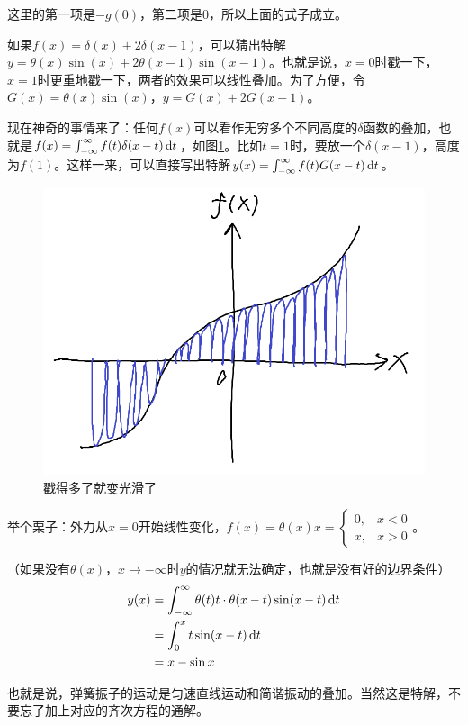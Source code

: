 这里的第一项是$-g(0)$，第二项是$0$，所以上面的式子成立。

如果$f(x)=\delta(x)+2 \delta(x-1)$，可以猜出特解$y=\theta(x) \sin(x)+2 \theta(x-1) \sin(x-1)$。也就是说，$x=0$时戳一下，$x=1$时更重地戳一下，两者的效果可以线性叠加。为了方便，令$G(x)=\theta(x) \sin(x)$，$y=G(x)+2 G(x-1)$。

现在神奇的事情来了：任何$f(x)$可以看作无穷多个不同高度的$\delta$函数的叠加，也就是$f(x)=\int_{-\infty}^{\infty} f(t) \delta(x-t) \mathop{}\!\mathrm{d} t$，如图\ref{fig-many-delta}。比如$t=1$时，要放一个$\delta(x-1)$，高度为$f(1)$。这样一来，可以直接写出特解$y(x)=\int_{-\infty}^{\infty} f(t) G(x-t) \mathop{}\!\mathrm{d} t$。
\begin{figure}[htb]
\centering
\includegraphics[scale=0.5]{fig/many-delta}
\caption{戳得多了就变光滑了}
\label{fig-many-delta}
\end{figure}

举个栗子：外力从$x=0$开始线性变化，$f(x)=\theta(x) x=\begin{cases} 0, &x<0 \\ x, &x>0 \end{cases}$。

（如果没有$\theta(x)$，$x \rightarrow -\infty$时$y$的情况就无法确定，也就是没有好的边界条件）
\begin{align*}
y(x)&=\int_{-\infty}^{\infty} \theta(t) t \cdot \theta(x-t) \sin(x-t) \mathop{}\!\mathrm{d} t \\
&=\int_{0}^{x} t \sin(x-t) \mathop{}\!\mathrm{d} t \\
&=x-\sin x
\end{align*}

也就是说，弹簧振子的运动是匀速直线运动和简谐振动的叠加。当然这是特解，不要忘了加上对应的齐次方程的通解。

